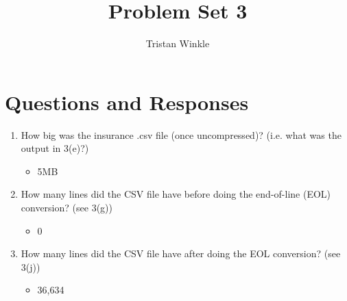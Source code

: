 \documentclass[12pt]{article}
\title{Problem Set 3}
\author{Tristan Winkle}
\date{}
\begin{document}
\maketitle

\section{Questions and Responses}

\begin{enumerate}
	\item How big was the insurance .csv file (once uncompressed)? (i.e. what was the output in 3(e)?)
        \begin{itemize}
            \item[-] 5MB
        \end{itemize}
        
	\item How many lines did the CSV file have before doing the end-of-line (EOL) conversion? (see 3(g))
        \begin{itemize}
            \item[-] 0
        \end{itemize}
        
	\item How many lines did the CSV file have after doing the EOL conversion? (see 3(j))
        \begin{itemize}
            \item[-] 36,634
        \end{itemize}
\end{enumerate}

\end{document}
